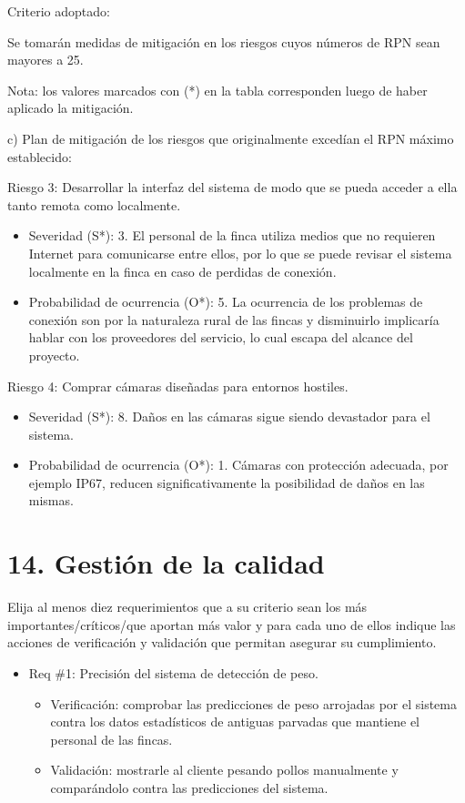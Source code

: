 \documentclass[
11pt, %
]{charter}
\begin{document}
Criterio adoptado: 

Se tomarán medidas de mitigación en los riesgos cuyos números de RPN sean mayores a 25.

Nota: los valores marcados con (*) en la tabla corresponden luego de haber aplicado la mitigación.

c) Plan de mitigación de los riesgos que originalmente excedían el RPN máximo establecido:
 
Riesgo 3: Desarrollar la interfaz del sistema de modo que se pueda acceder a ella tanto remota como localmente.
  \begin{itemize}
	\item Severidad (S*): 3.
          El personal de la finca utiliza medios que no requieren Internet para comunicarse entre ellos, por lo que se puede revisar el sistema localmente en la finca en caso de perdidas de conexión.
	\item Probabilidad de ocurrencia (O*): 5.
          La ocurrencia de los problemas de conexión son por la naturaleza rural de las fincas y disminuirlo implicaría hablar con los proveedores del servicio, lo cual escapa del alcance del proyecto.
	\end{itemize}

Riesgo 4: Comprar cámaras diseñadas para entornos hostiles.
  \begin{itemize}
	\item Severidad (S*): 8.
          Daños en las cámaras sigue siendo devastador para el sistema.
	\item Probabilidad de ocurrencia (O*): 1.
          Cámaras con protección adecuada, por ejemplo IP67, reducen significativamente la posibilidad de daños en las mismas.
	\end{itemize}



\section{14. Gestión de la calidad}
\label{sec:calidad}

Elija al menos diez requerimientos que a su criterio sean los más importantes/críticos/que aportan más valor y para cada uno de ellos indique las acciones de verificación y validación que permitan asegurar su cumplimiento.

\begin{itemize} 
\item Req \#1: Precisión del sistema de detección de peso.
	\begin{itemize}
	\item Verificación: comprobar las predicciones de peso arrojadas por el sistema contra los datos estadísticos de antiguas parvadas que mantiene el personal de las fincas.
	\item Validación: mostrarle al cliente pesando pollos manualmente y comparándolo contra las predicciones del sistema.
	\end{itemize}
\end{itemize}
\end{document}
